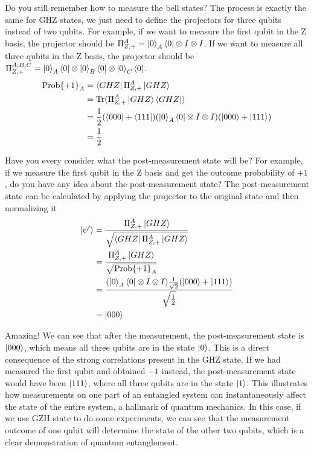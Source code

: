 \documentclass[11pt, letterpaper]{article}
\begin{document}
Do you still remember how to measure the bell states? The process is exactly the same for GHZ states, we just need to define the projectors for three qubits instead of two qubits. For example, if we want to measure the first qubit in the Z basis, the projector should be $\Pi_{Z, +}^{A} = \ket{0}_A\bra{0} \otimes I \otimes I$. If we want to measure all three qubits in the Z basis, the projector should be $\Pi_{Z, +}^{A, B, C} = \ket{0}_A\bra{0} \otimes \ket{0}_B\bra{0} \otimes \ket{0}_C\bra{0}$.
\begin{equation}
  \begin{aligned}
    \text{Prob\{+1\}}_A & = \bra{GHZ} \Pi_{Z, +}^{A} \ket{GHZ} \\
    & = \text{Tr}(\Pi_{Z, +}^{A} \ket{GHZ}\bra{GHZ}) \\
    & = \frac{1}{2}(\bra{000} + \bra{111})(\ket{0}_A\bra{0} \otimes I \otimes I)(\ket{000} + \ket{111}) \\
    & = \frac{1}{2}
  \end{aligned}
\end{equation}

Have you every consider what the post-measurement state will be? For example, if we measure the first qubit in the Z basis and get the outcome probability of $+1$, do you have any idea about the post-measurement state? The post-measurement state can be calculated by applying the projector to the original state and then normalizing it
\begin{equation}
  \begin{aligned}
    \ket{\psi'} & = \frac{\Pi_{Z, +}^{A} \ket{GHZ}}{\sqrt{\bra{GHZ} \Pi_{Z, +}^{A} \ket{GHZ}}} \\
    & = \frac{\Pi_{Z, +}^{A} \ket{GHZ}}{\sqrt{\text{Prob\{+1\}}_A}} \\
    & = \frac{(\ket{0}_A\bra{0} \otimes I \otimes I) \frac{1}{\sqrt{2}}(\ket{000} + \ket{111})}{\sqrt{\frac{1}{2}}} \\
    & = \ket{000}
  \end{aligned}
\end{equation}

Amazing! We can see that after the measurement, the post-measurement state is $\ket{000}$, which means all three qubits are in the state $\ket{0}$. This is a direct consequence of the strong correlations present in the GHZ state. If we had measured the first qubit and obtained $-1$ instead, the post-measurement state would have been $\ket{111}$, where all three qubits are in the state $\ket{1}$. This illustrates how measurements on one part of an entangled system can instantaneously affect the state of the entire system, a hallmark of quantum mechanics. In this case, if we use GZH state to do some experiments, we can see that the measurement outcome of one qubit will determine the state of the other two qubits, which is a clear demonstration of quantum entanglement.
\end{document}
